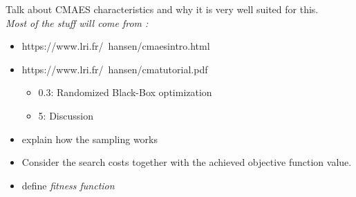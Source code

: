 Talk about CMAES characteristics and why it is very well suited for this.\\
\color{red}\emph{Most of the stuff will come from :}
\begin{itemize}
	\item https://www.lri.fr/~hansen/cmaesintro.html
	\item https://www.lri.fr/~hansen/cmatutorial.pdf
	\begin{itemize}
		\item 0.3: Randomized Black-Box optimization
		\item 5: Discussion
	\end{itemize}	\color{black}

	\item explain how the sampling works
	\item Consider the search costs together with the achieved objective function value.
	\item define \emph{fitness function}
\end{itemize}
	\color{black}
